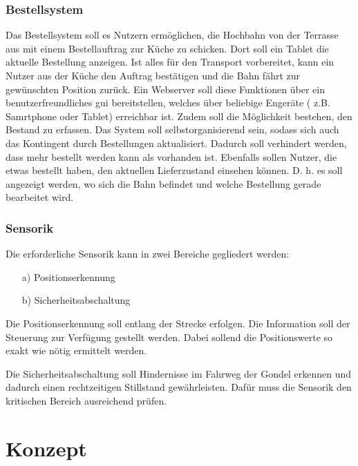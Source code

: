 \subsection{Bestellsystem}


Das Bestellsystem soll es Nutzern ermöglichen, die Hochbahn von der Terrasse aus mit einem Bestellauftrag zur Küche zu schicken. 
Dort soll ein Tablet die aktuelle Bestellung anzeigen. Ist alles für den Transport vorbereitet, kann ein Nutzer aus der Küche den Auftrag 
bestätigen und die Bahn fährt zur gewünschten Position zurück. Ein Webserver soll diese Funktionen über ein benutzerfreundliches \acrfull{gui} bereitstellen, welches über beliebige Engeräte ( z.B. Samrtphone oder Tablet) erreichbar ist.
Zudem soll die Möglichkeit bestehen, den Bestand zu erfassen. Das System soll selbstorganisierend sein, sodass sich auch das Kontingent durch Bestellungen aktualisiert. Dadurch soll verhindert werden, dass mehr bestellt werden kann als vorhanden ist.
Ebenfalls sollen Nutzer, die etwas bestellt haben, den aktuellen Lieferzustand einsehen können. D. h. es soll angezeigt werden, wo sich die Bahn befindet und welche Bestellung gerade bearbeitet wird.



\subsection{Sensorik}
Die erforderliche Sensorik kann in zwei Bereiche gegliedert werden: 

\begin{itemize}
	\item [a)] Positionserkennung 
	\item [b)] Sicherheitsabschaltung 
	
\end{itemize}

Die Positionserkennung soll entlang der Strecke erfolgen. Die Information soll der Steuerung zur Verfügung gestellt werden. Dabei sollend die Positionswerte so exakt wie nötig ermittelt werden.

Die Sicherheitsabschaltung soll Hindernisse im Fahrweg der Gondel erkennen und dadurch einen rechtzeitigen Stillstand gewährleisten. Dafür muss die Sensorik den kritischen Bereich ausreichend prüfen. 





\chapter{Konzept}
